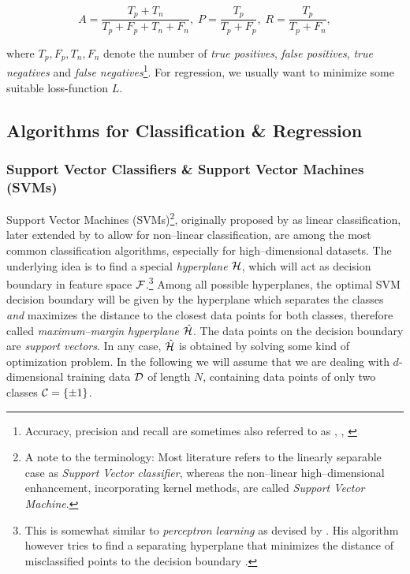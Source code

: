 \begin{equation}
A = \frac{T_p + T_n}{T_p + F_p + T_n + F_n}, \; P = \frac{T_p}{T_p + F_p}, \; R = \frac{T_p}{T_p + F_n},
\end{equation}


where $T_p, F_p, T_n, F_n$ denote the number of \emph{true positives}, \emph{false positives}, \emph{true negatives} and \emph{false negatives}\footnote{Accuracy, precision and recall are sometimes also referred to as \emph{}, \emph{}, \emph{}}. For regression, we usually want to minimize some suitable loss-function $L$.

\subsection{Algorithms for Classification \& Regression}
\subsubsection{Support Vector Classifiers \& Support Vector Machines (SVMs)}

Support Vector Machines (SVMs)\footnote{A note to the terminology: Most literature refers to the linearly separable case as \emph{Support Vector classifier}, whereas the non--linear high--dimensional enhancement, incorporating kernel methods, are called \emph{Support Vector Machine}.}, originally proposed by \citet{vapnik1963} as linear classification, later extended by \citet{cortes1995} to allow for non--linear classification, are among the most common classification algorithms, especially for high--dimensional datasets. The underlying idea is to find a special \emph{hyperplane} $\mathcal{H}$, which will act as decision boundary in feature space $\mathcal{F}$.\footnote{This is somewhat similar to \emph{perceptron learning} as devised by \citet{rosenblatt1958}. His algorithm however tries to find a separating hyperplane that minimizes the distance of misclassified points to the decision boundary \citep{hastie2001}.} Among all possible hyperplanes, the optimal SVM decision boundary will be given by the hyperplane which separates the classes \emph{and} maximizes the distance to the closest data points for both classes, therefore called \emph{maximum--margin hyperplane} $\hat {\mathcal{H}}$. The data points on the decision boundary are \emph{support vectors}. In any case, $\hat {\mathcal{H}}$ is obtained by solving some kind of optimization problem. In the following we will assume that we are dealing with $d$-dimensional training data $\mathcal{D}$ of length $N$, containing data points of only two classes $\mathcal{C} = \{ \pm 1 \}$. \\


